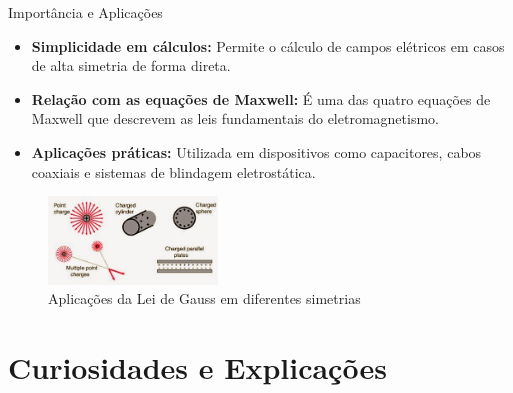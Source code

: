 \documentclass{beamer}
\begin{document}
  \begin{frame}{Importância e Aplicações}
  \begin{itemize}
      \item \textbf{Simplicidade em cálculos:} Permite o cálculo de campos elétricos em casos de alta simetria de forma direta.
      \item \textbf{Relação com as equações de Maxwell:} É uma das quatro equações de Maxwell que descrevem as leis fundamentais do eletromagnetismo.
      \item \textbf{Aplicações práticas:} Utilizada em dispositivos como capacitores, cabos coaxiais e sistemas de blindagem eletrostática.
  \end{itemize}
  
  \begin{figure}
  \centering
  \includegraphics[width=0.4\textwidth]{images/aplicacoes_gauss.png}
  \caption{Aplicações da Lei de Gauss em diferentes simetrias}
  \end{figure}
  
  \end{frame}
  
  \section{Curiosidades e Explicações}
  
\end{document}
